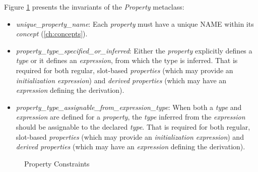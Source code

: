 Figure \ref{fig:ocl:property} presents the invariants
of the \emph{Property} metaclass:

\begin{itemize}

\item \emph{unique\_property\_name}:
Each \emph{property} must have a unique NAME within its \emph{concept}
(\ref{ch:concepts}).

\item \emph{property\_type\_specified\_or\_inferred}:
Either the \emph{property} explicitly defines a \emph{type}
or it defines an \emph{expression},
from which the type is inferred.
That is required for both regular, slot-based \emph{properties}
(which may provide an \emph{initialization expression})
and \emph{derived properties}
(which may have an \emph{expression} defining the derivation).

\item \emph{property\_type\_assignable\_from\_expression\_type}:
When both a \emph{type} and \emph{expression} are defined for a \emph{property},
the \emph{type} inferred from the \emph{expression} should be assignable to
the declared \emph{type}.
That is required for both regular, slot-based \emph{properties}
(which may provide an \emph{initialization expression})
and \emph{derived properties}
(which may have an \emph{expression} defining the derivation).

\end{itemize}

\begin{figure}

\caption{Property Constraints}
\label{fig:ocl:property}
\end{figure}
